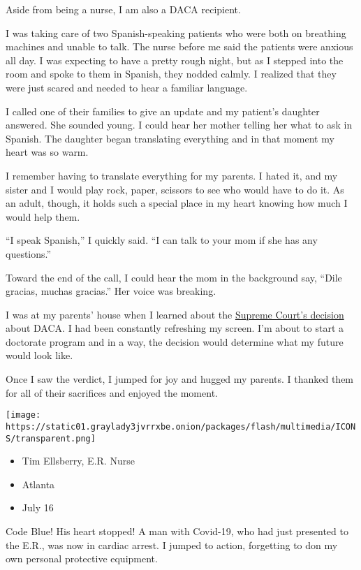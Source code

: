 Aside from being a nurse, I am also a DACA recipient.

I was taking care of two Spanish-speaking patients who were both on
breathing machines and unable to talk. The nurse before me said the
patients were anxious all day. I was expecting to have a pretty rough
night, but as I stepped into the room and spoke to them in Spanish, they
nodded calmly. I realized that they were just scared and needed to hear
a familiar language.

I called one of their families to give an update and my patient's
daughter answered. She sounded young. I could hear her mother telling
her what to ask in Spanish. The daughter began translating everything
and in that moment my heart was so warm.

I remember having to translate everything for my parents. I hated it,
and my sister and I would play rock, paper, scissors to see who would
have to do it. As an adult, though, it holds such a special place in my
heart knowing how much I would help them.

``I speak Spanish,'' I quickly said. ``I can talk to your mom if she has
any questions.''

Toward the end of the call, I could hear the mom in the background say,
``Dile gracias, muchas gracias.'' Her voice was breaking.

I was at my parents' house when I learned about the
\href{https://www.nytimes3xbfgragh.onion/2020/06/18/us/trump-daca-supreme-court.html}{Supreme
Court's decision} about DACA. I had been constantly refreshing my
screen. I'm about to start a doctorate program and in a way, the
decision would determine what my future would look like.

Once I saw the verdict, I jumped for joy and hugged my parents. I
thanked them for all of their sacrifices and enjoyed the moment.

\texttt{[image: https://static01.graylady3jvrrxbe.onion/packages/flash/multimedia/ICONS/transparent.png]}

\begin{itemize}
\tightlist
\item
  Tim Ellsberry, E.R. Nurse
\item
  Atlanta
\item
  July 16
\end{itemize}

Code Blue! His heart stopped! A man with Covid-19, who had just
presented to the E.R., was now in cardiac arrest. I jumped to action,
forgetting to don my own personal protective equipment.

